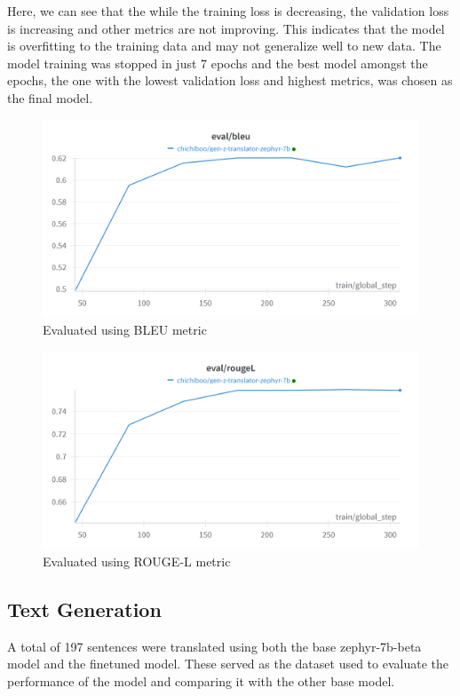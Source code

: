 Here, we can see that the while the training loss is decreasing, the validation loss is increasing and other metrics are not improving. This indicates that the model is overfitting to the training data and may not generalize well to new data. The model training was stopped in just 7 epochs and the best model amongst the epochs, the one with the lowest validation loss and highest metrics, was chosen as the final model.

\begin{figure}
	\caption{Evaluated using BLEU metric}
	\centering
	\includegraphics[scale=0.2]{figures/BLEUEvaluation.png}
\end{figure}
\begin{figure}
	\caption{Evaluated using ROUGE-L metric}
	\centering
	\includegraphics[scale=0.2]{figures/ROUGELEvaluation.png}
\end{figure}

\subsection{Text Generation}
A total of 197 sentences were translated using both the base zephyr-7b-beta model and the finetuned model. These served as the dataset used to evaluate the performance of the model and comparing it with the other base model.

